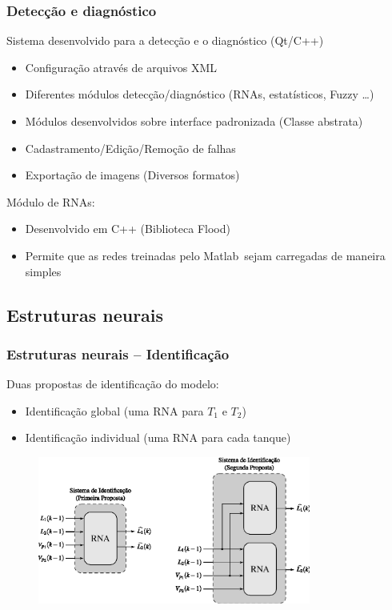 \documentclass{beamer}
\begin{document}
\begin{frame}
    \frametitle{Detecção e diagnóstico}

    Sistema desenvolvido para a detecção e o diagnóstico (Qt/C++)

\begin{itemize}
    \item Configuração através de arquivos XML
    \item Diferentes módulos detecção/diagnóstico (RNAs, estatísticos, Fuzzy
          \ldots)
    \item Módulos desenvolvidos sobre interface padronizada (Classe abstrata)
    \item Cadastramento/Edição/Remoção de falhas
    \item Exportação de imagens (Diversos formatos)
\end{itemize}

    Módulo de RNAs:

\begin{itemize}
    \item Desenvolvido em C++ (Biblioteca Flood)
    \item Permite que as redes treinadas pelo Matlab\reg\ sejam carregadas de
          maneira simples
\end{itemize}

\end{frame}

\subsection{Estruturas neurais}
\begin{frame}
    \frametitle{Estruturas neurais -- Identificação}

    Duas propostas de identificação do modelo:

\begin{itemize}
    \item Identificação global (uma RNA para $T_1$ e $T_2$)
    \item Identificação individual (uma RNA para cada tanque)
\end{itemize}

\begin{figure}[htb]
\centering
    \includegraphics[width=0.8\textwidth]{imgs/sistema/eps/sist_ident}
\end{figure}

\end{frame}
\end{document}
